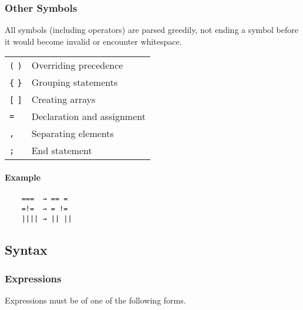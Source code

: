 \subsubsection{Other Symbols}

All symbols (including operators) are parsed greedily, not ending a symbol before it would become invalid or encounter whitespace.

\begin{table}[H]
    \begin{tabular}{ l l }
        \verb|(| \verb|)| & Overriding precedence      \\
        \verb|{| \verb|}| & Grouping statements        \\
        \verb|[| \verb|]| & Creating arrays            \\
        \verb|=|          & Declaration and assignment \\
        \verb|,|          & Separating elements        \\
        \verb|;|          & End statement
    \end{tabular}
\end{table}

\paragraph{Example}

\begin{verbatim}
    ===  → == =
    =!=  → = !=
    |||| → || ||
\end{verbatim}

\subsection{Syntax}

\subsubsection{Expressions}

Expressions must be of one of the following forms.


